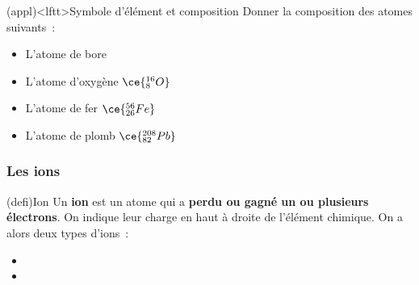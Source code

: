 \documentclass[../../main/main.tex]{subfiles}
\begin{document}
\begin{tcb}[label=exem:atomes](appl)<lftt>{Symbole d'élément et composition}
	Donner la composition des atomes suivants~:
	\smallbreak
	\begin{isd}
		\begin{itemize}
			\item L'atome de bore 
			      \smallbreak
			\item L'atome d'oxygène $\ce{^{16}_{8}O}$
			      \smallbreak
		\end{itemize}
		\tcblower
		\begin{itemize}
			\item L'atome de fer $ \ce{^{56}_{26}Fe}$
			      \smallbreak
			\item L'atome de plomb $\ce{^{208}_{82}Pb}$
			      \smallbreak
		\end{itemize}
	\end{isd}
\end{tcb}

\subsubsection{Les ions}

\begin{tcb}[label=def:ion](defi){Ion}
	Un \textbf{ion} est un atome qui a \textbf{perdu ou gagné un ou plusieurs
		électrons}. On indique leur charge en haut à droite de l'élément chimique.
	On a alors deux types d'ions~:
	\begin{itemize}
		\item {}%
		\item {}%
	\end{itemize}
\end{tcb}
\end{document}
